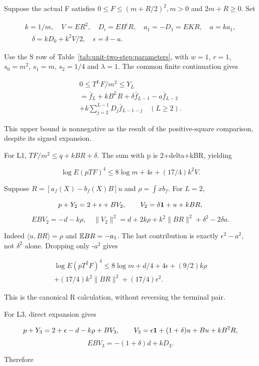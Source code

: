 Suppose the actual F satisfies \(0\le F\le (m+R/2)^2,\allowbreak  m>0\) and \(2m+R\ge 0.\) Set

\[
\begin{gathered}
k=1/m,\quad V=ER^2,\quad D_i=EB^iR,\quad a_1=-D_1=EKR,\quad a=ka_1,\\
\quad\delta=kD_0+k^2V/2,\quad\epsilon=\delta-a.
\end{gathered}\tag{R35.A12}
\]

Use the S row of Table~\ref{tab:unit-two-step:parameters}, with
$w=1$, $r=1$, $s_0=m^2$, $s_1=m$, $s_2=1/4$ and $\lambda=1$.
The common finite continuation gives

\[
\begin{gathered}
0\le T^LF/m^2\le Y_L\\
=\bar f_L+kB^LR+\delta \bar f_{L-1}-a \bar f_{L-2}\\
+k\sum_{j=2}^{L-1}D_j\bar f_{L-1-j}\quad(L\ge2).
\end{gathered}\tag{R35.A13}
\]

This upper bound is nonnegative as the result of the positive-square comparison, despite its signed expansion.

For L1, \(TF/m^2\le q+kBR+\delta.\) The sum with p is 2+delta+kBR, yielding

\[
\log E(pTF)^4\le8\log m+4\epsilon+(17/4)k^2V. \tag{R35.A14}
\]

Suppose $R=[a_f(X)-b_f(X)B]u$ and $\rho=\int x b_f$. For $L=2$,

\[
p+Y_2=2+\epsilon+BV_2,\qquad V_2=\delta\mathbf1+u+kBR,
\]
\[
EBV_2=-d-k\rho,\quad
\|V_2\|^2=d+2k\rho+k^2\|BR\|^2+\delta^2-2\delta a.
\]

Indeed $\langle u,BR\rangle=\rho$ and $\mathbb E BR=-a_1$. The last contribution is exactly \(\epsilon^2-a^2,\allowbreak \) not \(\delta^2\) alone. Dropping only -\(a^2\) gives

\[
\begin{gathered}
\log E(pT^2F)^4\le8\log m+d/4+4\epsilon+(9/2)k\rho\\
+(17/4)k^2\|BR\|^2+(17/4)\epsilon^2.
\end{gathered}\tag{R35.A15}
\]

This is the canonical R calculation, without reversing the terminal pair.

For L3, direct expansion gives

\[
p+Y_3=2+\epsilon-d-k\rho+BV_3,\qquad
V_3=\epsilon\mathbf1+(1+\delta)u+Bu+kB^2R,
\]
\[
EBV_3=-(1+\delta)d+kD_3.
\]

Therefore


